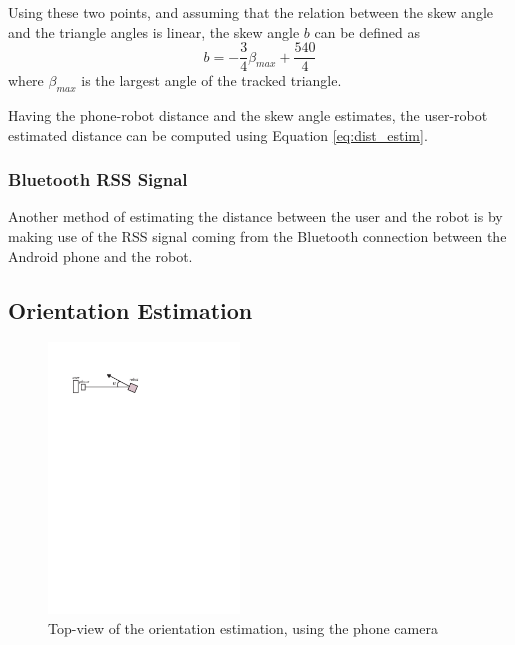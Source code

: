 \documentclass[journal]{IEEEtran}
\let\MYoriglatexcaption\caption
\renewcommand{\caption}[2][\relax]{\MYoriglatexcaption[#2]{#2}}
\begin{document}
Using these two points, and assuming that the relation between the skew angle and the triangle angles is linear, the skew angle $b$ can be defined as
\begin{equation}
b=-\frac{3}{4}\beta_{max}+\frac{540}{4}
\end{equation}
where $\beta_{max}$ is the largest angle of the tracked triangle.

Having the phone-robot distance and the skew angle estimates, the user-robot estimated distance can be computed using Equation \ref{eq:dist_estim}.

\subsubsection{Bluetooth RSS Signal}
Another method of estimating the distance between the user and the robot is by making use of the RSS signal coming from the Bluetooth connection between the Android phone and the robot.



\subsection{Orientation Estimation}
\begin{figure}[!htpb]
\centering
\includegraphics[width=2in]{images/orientation_meas}
\caption{Top-view of the orientation estimation, using the phone camera}
\label{fig:orient_camera}
\end{figure}

%
%
\end{document}
